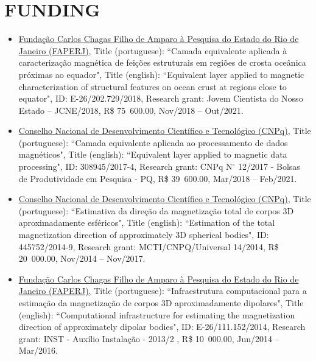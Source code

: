 \documentclass[paper=letter,fontsize=11pt]{scrartcl} %
\newcommand{\sepspace}{\vspace*{1em}}		%
\newcommand{\NewPart}[2]{\section*{\uppercase{#1} #2}}
\newcommand{\FundingEntry}[7]{
        \noindent #1, Title (portuguese): ``#2", Title (english): ``#3", ID: #4, Research grant: #5, R\$ #6, #7.}
\begin{document}
\sepspace

\NewPart{Funding}{}

\begin{itemize}

\item\FundingEntry{\href{http://www.faperj.br/}{Funda\c{c}\~{a}o Carlos Chagas Filho de Amparo \`{a} Pesquisa do Estado do Rio de Janeiro (FAPERJ)}}{Camada equivalente aplicada {\` a}  caracteriza{\c c}{\~ a}o magn{\' e}tica de fei{\c c}{\~ o}es estruturais em regi{\~ o}es de  crosta oce{\^ a}nica pr{\' o}ximas ao equador}{Equivalent layer applied to magnetic characterization of structural features on ocean crust at regions close to equator}{E-26/202.729/2018}{Jovem Cientista do Nosso Estado – JCNE/2018}{75~600.00}{Nov/2018 -- Out/2021}

\item\FundingEntry{\href{http://cnpq.br/pagina-inicial}{Conselho Nacional de Desenvolvimento Cient{\' i}fico e Tecnol\'{o}gico (CNPq)}}{Camada equivalente aplicada ao processamento de dados magn{\' e}ticos}{Equivalent layer applied to magnetic data processing}{308945/2017-4}{CNPq N$^{\circ}$ 12/2017 - Bolsas de Produtividade em Pesquisa - PQ}{39~600.00}{Mar/2018 -- Feb/2021}

\item\FundingEntry{\href{http://cnpq.br/pagina-inicial}{Conselho Nacional de Desenvolvimento Cient\'{i}fico e Tecnol\'{o}gico (CNPq)}}{Estimativa da dire\c{c}\~{a}o da magnetiza\c{c}\~{a}o total de corpos 3D aproximadamente esf\'{e}ricos}{Estimation of the total magnetization direction of approximately 3D spherical bodies}{445752/2014-9}{MCTI/CNPQ/Universal 14/2014}{20~000.00}{Nov/2014 -- Nov/2017}

\item\FundingEntry{\href{http://www.faperj.br/}{Funda\c{c}\~{a}o Carlos Chagas Filho de Amparo \`{a} Pesquisa do Estado do Rio de Janeiro (FAPERJ)}}{Infraestrutura computacional para a estima\c{c}\~{a}o da magnetiza\c{c}\~{a}o de corpos 3D aproximadamente dipolares}{Computational infrastructure for estimating the magnetization direction of approximately dipolar bodies}{E-26/111.152/2014}{INST - Aux{\' i}lio Instala{\c c}{\~ a}o - 2013/2 }{10~000.00}{Jun/2014 -- Mar/2016}

\end{itemize}
\end{document}
